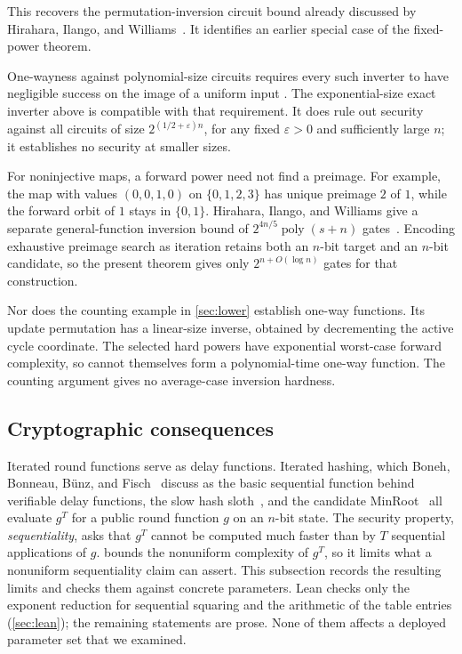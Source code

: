 \documentclass[11pt]{article}
\theoremstyle{definition}
\theoremstyle{remark}
\newcommand{\poly}{\operatorname{poly}}
\numberwithin{equation}{section}
\begin{document}
This recovers the permutation-inversion circuit bound already discussed
by Hirahara, Ilango, and Williams~\cite[Section~3.2]{HIW24}.
It identifies an earlier special case of the fixed-power theorem.

One-wayness against polynomial-size circuits requires every such inverter
to have negligible success on the image of a uniform input
\cite[Section~7.1.1]{Goldreich08}.  The exponential-size exact inverter above
is compatible with that requirement.  It does rule out security against
all circuits of size $2^{(1/2+\varepsilon)n}$, for any fixed
$\varepsilon>0$ and sufficiently large $n$; it establishes no security
at smaller sizes.

For noninjective maps, a forward power need not find a preimage.  For
example, the map with values $(0,0,1,0)$ on $\{0,1,2,3\}$ has unique
preimage $2$ of $1$, while the forward orbit of $1$ stays in $\{0,1\}$.
Hirahara, Ilango, and Williams give a separate general-function inversion
bound of $2^{4n/5}\poly(s+n)$ gates~\cite[Theorem~3.5]{HIW24}.
Encoding exhaustive preimage search as iteration retains both an $n$-bit
target and an $n$-bit candidate, so the present theorem gives only
$2^{n+O(\log n)}$ gates for that construction.

Nor does the counting example in \cref{sec:lower} establish one-way
functions.  Its update permutation has a linear-size inverse, obtained
by decrementing the active cycle coordinate.  The selected hard powers
have exponential worst-case forward complexity, so cannot themselves
form a polynomial-time one-way function.  The counting argument gives
no average-case inversion hardness.

\subsection{Cryptographic consequences}\label{sec:crypto}

Iterated round functions serve as delay functions.  Iterated hashing,
which Boneh, Bonneau, B\"unz, and Fisch~\cite{BBBF18} discuss as the basic
sequential function behind verifiable delay functions, the slow hash
sloth~\cite{LW15}, and the candidate MinRoot~\cite{KMT22} all evaluate
$g^T$ for a public round function $g$ on an $n$-bit state.  The security
property, \emph{sequentiality}, asks
that $g^T$ cannot be computed much faster than by $T$ sequential
applications of $g$.   bounds the nonuniform complexity of
$g^T$, so it limits what a nonuniform sequentiality claim can assert.
This subsection records the resulting limits and checks them against
concrete parameters.  Lean checks only the exponent reduction for
sequential squaring and the arithmetic of the table entries
(\cref{sec:lean}); the remaining statements are prose.  None of them
affects a deployed parameter set that we examined.
\end{document}
